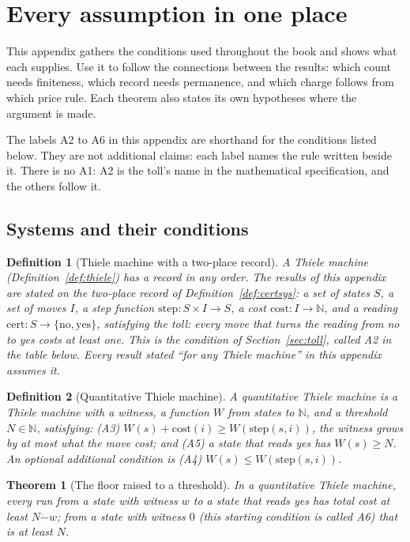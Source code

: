 \documentclass[11pt,twoside]{article}
\theoremstyle{thielethm}
\newtheorem{theorem}{Theorem}[section]
\theoremstyle{thieledef}
\newtheorem{definition}{Definition}[section]
\theoremstyle{thieledef}
\theoremstyle{thieledef}
\theoremstyle{thielethm}
\theoremstyle{thieleobs}
\theoremstyle{thielethm}
\begin{document}
\section{Every assumption in one place}

This appendix gathers the conditions used throughout the book and shows what each supplies.
Use it to follow the connections between the results: which count needs finiteness, which
record needs permanence, and which charge follows from which price rule. Each theorem also
states its own hypotheses where the argument is made.

The labels A2 to A6 in this appendix are shorthand for the conditions listed below.
They are not additional claims: each label names the rule written beside it. There is no A1: A2
is the toll's name in the mathematical specification, and the others follow it.

\subsection{Systems and their conditions}

\begin{definition}[Thiele machine with a two-place record]\label{def:app-certsys}
A Thiele machine (Definition~\ref{def:thiele}) has a record in any order. The results of
this appendix are stated on the two-place record of Definition~\ref{def:certsys}: a set of
states $S$, a set of moves $I$, a step function
$\mathrm{step}: S\times I\to S$, a cost $\mathrm{cost}:I\to\mathbb{N}$, and a reading
$\mathrm{cert}:S\to\{\mathrm{no},\mathrm{yes}\}$, satisfying the toll: every move that
turns the reading from no to yes costs at least one. This is the condition of
Section~\ref{sec:toll}, called A2 in the table below. Every result stated ``for any
Thiele machine'' in this appendix assumes it.
\end{definition}

\begin{definition}[Quantitative Thiele machine]\label{def:app-qcs}
A quantitative Thiele machine is a Thiele machine with a \emph{witness},
a function $W$ from states to $\mathbb{N}$, and a threshold $N \in \mathbb{N}$, satisfying:
(A3) $W(s) + \mathrm{cost}(i) \ge W(\mathrm{step}(s, i))$, the witness grows by at most
what the move cost; and (A5) a state that reads yes has $W(s) \ge N$.
An optional additional condition is (A4) $W(s) \le W(\mathrm{step}(s, i))$.
\end{definition}

\begin{theorem}[The floor raised to a threshold]\label{thm:app-quantitative}
In a quantitative Thiele machine, every run from a state with witness $w$ to a state that reads yes has total cost at least $N \mathbin{\dot{-}} w$; from a state with witness $0$ (this starting condition is called A6) that is at least $N$.
\end{theorem}
\end{document}
